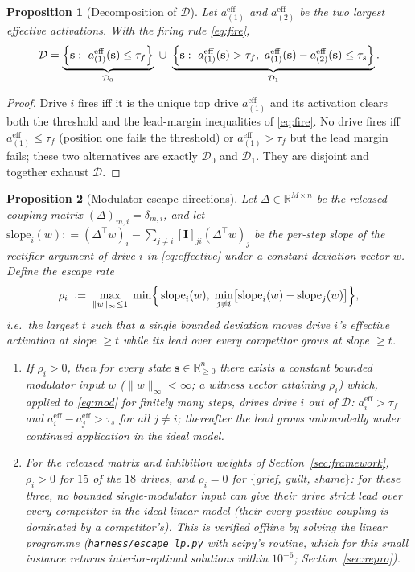 \documentclass[journal]{IEEEtran}
\newcommand{\R}{\mathbb{R}}
\newcommand{\DD}{\mathcal{D}}
\newcommand{\bs}{\mathbf{s}}
\newcommand{\bI}{\mathbf{I}}
\newcommand{\bslope}{\mathrm{slope}}
\newtheorem{proposition}{Proposition}
\begin{document}
\begin{proposition}[Decomposition of $\DD$]
\label{prop:decomp}
Let $a_{(1)}^{\mathrm{eff}}$ and $a_{(2)}^{\mathrm{eff}}$ be the two
largest effective activations. With the firing rule
\eqref{eq:fire},
\[
\DD
=\underbrace{\Bigl\{\bs:\ a_{(1)}^{\mathrm{eff}}(\bs)\le\tau_f\Bigr\}}_{\DD_0}
\ \cup\ \underbrace{\Bigl\{\bs:\ a_{(1)}^{\mathrm{eff}}(\bs)>\tau_f,\
a_{(1)}^{\mathrm{eff}}(\bs)-a_{(2)}^{\mathrm{eff}}(\bs)\le\tau_s
\Bigr\}}_{\DD_1}.
\]
\end{proposition}

\begin{proof}
Drive $i$ fires iff it is the unique top drive $a_{(1)}^{\mathrm{eff}}$
and its activation clears both the threshold and the lead-margin
inequalities of \eqref{eq:fire}. No drive fires iff $a_{(1)}^{\mathrm{eff}}\le\tau_f$
(position one fails the threshold) or
$a_{(1)}^{\mathrm{eff}}>\tau_f$ but the lead margin fails; these two
alternatives are exactly $\DD_0$ and $\DD_1$. They are disjoint and
together exhaust $\DD$.
\end{proof}

\begin{proposition}[Modulator escape directions]
\label{prop:escape}
Let $\Delta\in\R^{M\times n}$ be the released coupling matrix
$(\Delta)_{m,i}=\delta_{m,i}$, and let
$\bslope_i(w)\mathrel{\mathop:}=(\Delta^{\top}w)_i-\sum_{j\ne i}[\bI]_{ji}(\Delta^{\top}w)_j$
be the per-step slope of the rectifier argument of drive $i$ in
\eqref{eq:effective} under a constant deviation vector $w$. Define the
\emph{escape rate}
\[
\rho_i\;\mathrel{\mathop:}=\;\max_{\|w\|_\infty\le 1}\;
\min\Bigl\{\,\bslope_i(w),\;
\min_{j\ne i}\bigl[\bslope_i(w)-\bslope_j(w)\bigr]\Bigr\},
\]
i.e.\ the largest $t$ such that a single bounded deviation moves drive
$i$'s effective activation at slope $\ge t$ while its lead over every
competitor grows at slope $\ge t$.
\begin{enumerate}
\item[(i)] If $\rho_i>0$, then for every state $\bs\in\R_{\ge0}^{n}$
there exists a constant bounded modulator input $w$ ($\|w\|_\infty<\infty$;
a witness vector attaining $\rho_i$) which, applied to \eqref{eq:mod}
for finitely many steps, drives drive $i$ out of $\DD$:
$a_i^{\mathrm{eff}}>\tau_f$ and
$a_i^{\mathrm{eff}}-a_j^{\mathrm{eff}}>\tau_s$ for all $j\ne i$;
thereafter the lead grows unboundedly under continued application in
the \emph{ideal} model.
\item[(ii)] For the released matrix and inhibition weights of
Section~\ref{sec:framework}, $\rho_i>0$ for $15$ of the $18$
drives, and $\rho_i=0$ for $\{$grief, guilt, shame$\}$:
for these three, \emph{no} bounded single-modulator input can give
their drive strict lead over every competitor in the ideal linear
model (their every positive coupling is dominated by a competitor's).
This is verified offline by solving the linear programme
(\texttt{harness/escape\_lp.py} with scipy's routine, which for this
small instance returns interior-optimal solutions within
$10^{-6}$; Section~\ref{sec:repro}).
\end{enumerate}
\end{proposition}
\end{document}
